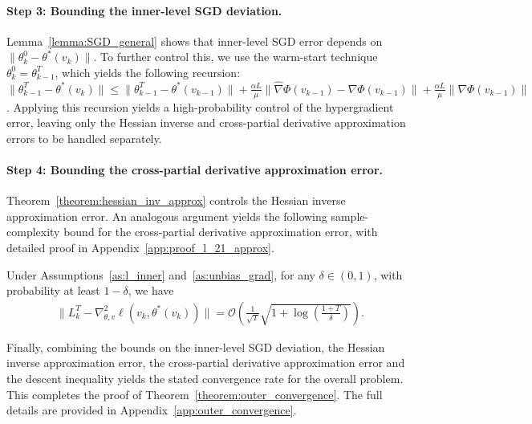 \documentclass[11 pt]{article}
\begin{document}
\paragraph{Step 3: Bounding the inner-level SGD deviation.}
Lemma~\ref{lemma:SGD_general} shows that inner-level SGD error depends on $\|\theta_k^0 - \theta^*(v_k)\|$. To further control this, we use the  
warm-start technique $\theta_k^0 = \theta_{k-1}^T$, which yields the following recursion: $\|\theta_{k-1}^{T} - \theta^*(v_k)\|\le
\|\theta_{k-1}^{T} - \theta^*(v_{k-1})\|+ \frac{\alpha L}{\mu}
\|\widehat{\nabla}\Phi(v_{k-1}) - \nabla\Phi(v_{k-1})\| + \frac{\alpha L}{\mu}
\|\nabla\Phi(v_{k-1})\|$. Applying this recursion yields a high-probability control of the hypergradient error, leaving only the Hessian inverse and cross-partial derivative approximation errors to be handled separately.


\paragraph{Step 4: Bounding the cross-partial derivative approximation error.}
Theorem~\ref{theorem:hessian_inv_approx} controls the Hessian inverse approximation error. An analogous argument yields the following sample-complexity bound for the cross-partial derivative approximation error, with detailed proof in Appendix~\ref{app:proof_l_21_approx}.


\begin{proposition}
\label{prop:l_21_approx}
Under Assumptions~\ref{as:l_inner} and~\ref{as:unbias_grad}, for any 
$\delta\in(0,1)$, with probability at least $1-\delta$, we have
\begin{align*}
    \;\|L_k^{T} - \nabla_{\theta,v}^2 \ell(v_k,\theta^*(v_k))\|
=
\mathcal{O}\!\left(
\frac{1}{\sqrt{T}}
\sqrt{1+\log\!\left(\frac{1+T}{\delta}\right)}
\right).
\end{align*}
\end{proposition}


Finally, combining the bounds on the inner-level SGD deviation, the Hessian inverse approximation error, the cross-partial derivative approximation error and the descent inequality 
yields the stated convergence rate for the overall problem. 
This completes the proof of Theorem~\ref{theorem:outer_convergence}. 
The full details are provided in Appendix~\ref{app:outer_convergence}.
\end{document}
